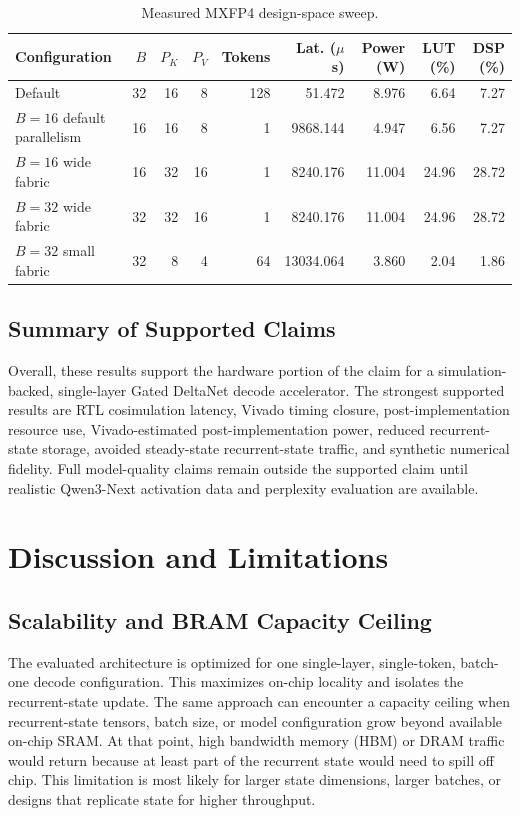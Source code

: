 \documentclass[conference]{IEEEtran}
\begin{document}
\begin{table}[t]
\centering
\caption{Measured MXFP4 design-space sweep.}
\label{tab:sweep_results}
\footnotesize
\begin{tabular}{lrrrrrrrr}
\toprule
Configuration & $B$ & $P_K$ & $P_V$ & Tokens & Lat. ($\mu$s) & Power (W) & LUT (\%) & DSP (\%) \\
\midrule
Default & 32 & 16 & 8 & 128 & 51.472 & 8.976 & 6.64 & 7.27 \\
$B=16$ default parallelism & 16 & 16 & 8 & 1 & 9868.144 & 4.947 & 6.56 & 7.27 \\
$B=16$ wide fabric & 16 & 32 & 16 & 1 & 8240.176 & 11.004 & 24.96 & 28.72 \\
$B=32$ wide fabric & 32 & 32 & 16 & 1 & 8240.176 & 11.004 & 24.96 & 28.72 \\
$B=32$ small fabric & 32 & 8 & 4 & 64 & 13034.064 & 3.860 & 2.04 & 1.86 \\
\bottomrule
\end{tabular}
\end{table}

\subsection{Summary of Supported Claims}
Overall, these results support the hardware portion of the claim for a simulation-backed, single-layer Gated DeltaNet decode accelerator. The strongest supported results are RTL cosimulation latency, Vivado timing closure, post-implementation resource use, Vivado-estimated post-implementation power, reduced recurrent-state storage, avoided steady-state recurrent-state traffic, and synthetic numerical fidelity. Full model-quality claims remain outside the supported claim until realistic Qwen3-Next activation data and perplexity evaluation are available.

\section{Discussion and Limitations}

\subsection{Scalability and BRAM Capacity Ceiling}
The evaluated architecture is optimized for one single-layer, single-token, batch-one decode configuration. This maximizes on-chip locality and isolates the recurrent-state update. The same approach can encounter a capacity ceiling when recurrent-state tensors, batch size, or model configuration grow beyond available on-chip SRAM. At that point, high bandwidth memory (HBM) or DRAM traffic would return because at least part of the recurrent state would need to spill off chip. This limitation is most likely for larger state dimensions, larger batches, or designs that replicate state for higher throughput.
\end{document}
